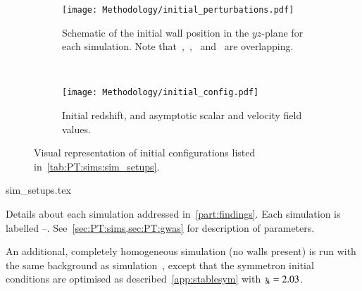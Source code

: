     \begin{figure}[ht]
        \centering
        \begin{subfigure}[t]{0.62\linewidth}
            \centering
            \texttt{[image: Methodology/initial\_perturbations.pdf]}
            \caption{Schematic of the initial wall position in the $yz$-plane for each simulation. Note that~,~,~ and~ are overlapping.} %
            \label{fig:PT:sims:intital_perturbations}
        \end{subfigure}
        ~
        \begin{subfigure}[t]{0.32\linewidth}
            \centering
            \texttt{[image: Methodology/initial\_config.pdf]}
            \caption{Initial redshift, and asymptotic scalar and velocity field values.}
            \label{fig:PT:sims:initial_config}
        \end{subfigure}
        \caption{Visual representation of initial configurations listed in~\cref{tab:PT:sims:sim_setups}.}
        \label{fig:PT:sims:initial_configs}
    \end{figure}


    \begin{table}[h]
        {sim_setups.tex}
        \caption{Details about each simulation addressed in~\cref{part:findings}. Each simulation is labelled --. See~\cref{sec:PT:sims,sec:PT:gwas} for description of parameters.} %
        \label{tab:PT:sims:sim_setups}
    \end{table}



    An additional, completely homogeneous simulation (no walls present) is run with the same background as simulation~, except that the symmetron initial conditions are optimised as described~\cref{app:stablesym} with $\mathfrak{z}_\mathrm{i}=2.03$. %
    
    




